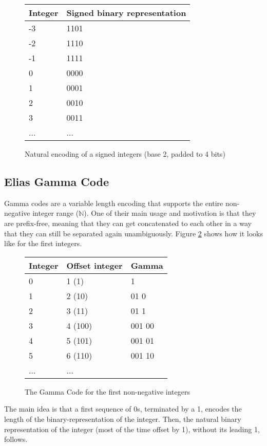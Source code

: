 \documentclass{acm_proc_article-sp}
\begin{document}
\begin{figure}
\caption{Natural encoding of a signed integers (base 2, padded to 4 bits)}
\label{figure-natural-encoding-padded}
\center
\begin{tabular}{|l|l|}
\hline
Integer & Signed binary representation \\
\hline
-3 & 1101 \\
\hline
-2 & 1110 \\
\hline
-1 & 1111 \\
\hline
0 & 0000 \\
\hline
1 & 0001 \\
\hline
2 & 0010 \\
\hline
3 & 0011 \\
\hline
... & ... \\
\hline
\end{tabular}
\end{figure}

\subsection{Elias Gamma Code}
\label{section-gamma-code}

Gamma codes are a variable length encoding that supports the entire non-negative integer range ($\mathbb{N}$). One of their main usage and motivation is that they are prefix-free, meaning that they can get concatenated to each other in a way that they can still be separated again unambiguously. Figure \ref{figure-gamma-encoding} shows how it looks like for the first integers.

\begin{figure}
\caption{The Gamma Code for the first non-negative integers}
\label{figure-gamma-encoding}
\center
\begin{tabular}{|l|l|l|}
\hline
Integer & Offset integer & Gamma \\
\hline
0 & 1 (1) & 1 \\
\hline
1 & 2 (10) & 01 0  \\
\hline
2 & 3 (11) & 01 1  \\
\hline
3 & 4 (100) & 001 00 \\
\hline
4 & 5 (101) & 001 01 \\
\hline
5 & 6 (110) & 001 10 \\
\hline
... & ... \\
\hline
\end{tabular}
\end{figure}

 The main idea is that a first sequence of 0s, terminated by a 1, encodes the length of the binary-representation of the integer. Then, the natural binary representation of the integer (most of the time offset by 1), without its leading 1, follows.
\end{document}
